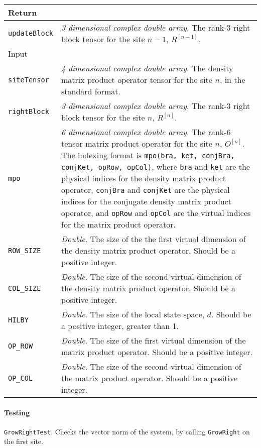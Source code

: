  \begin{longtabu}{X[1,l]X[4,l]}
 \hline
 Return & \\ \hline
 \lstinline$updateBlock$ & \emph{3 dimensional complex double array}. The rank-3 right block tensor for the site \(n - 1\), \(R^{[n-1]}\). \\ \hline
 Input & \\ \hline
 \lstinline$siteTensor$ & \emph{4 dimensional complex double array}. The density matrix product operator tensor for the site \(n\), in the standard format. \\
 \lstinline$rightBlock$ & \emph{3 dimensional complex double array}. The rank-3 right block tensor for the site \(n\), \(R^{[n]}\). \\
 \lstinline$mpo$ & \emph{6 dimensional complex double array}. The rank-6 tensor matrix product operator for the site \(n\), \(O^{[n]}\). The indexing format is \lstinline$mpo(bra, ket, conjBra, conjKet, opRow, opCol)$, where \lstinline$bra$ and \lstinline$ket$ are the physical indices for the density matrix product operator, \lstinline$conjBra$ and \lstinline$conjKet$ are the physical indices for the conjugate density matrix product operator, and \lstinline$opRow$ and \lstinline$opCol$ are the virtual indices for the matrix product operator. \\
 \lstinline$ROW_SIZE$ & \emph{Double}. The size of the the first virtual dimension of the density matrix product operator. Should be a positive integer. \\
 \lstinline$COL_SIZE$ & \emph{Double}. The size of the second virtual dimension of the density matrix product operator. Should be a positive integer. \\ 
 \lstinline$HILBY$ & \emph{Double}. The size of the local state space, \(d\). Should be a positive integer, greater than 1. \\
 \lstinline$OP_ROW$ & \emph{Double}. The size of the first virtual dimension of the matrix product operator. Should be a positive integer. \\
 \lstinline$OP_COL$ & \emph{Double}. The size of the second virtual dimension of the matrix product operator. Should be a positive integer. \\
 \hline
 \end{longtabu}
 \paragraph{Testing} \lstinline$GrowRightTest$. Checks the vector norm of the system, by calling \lstinline$GrowRight$ on the first site.


